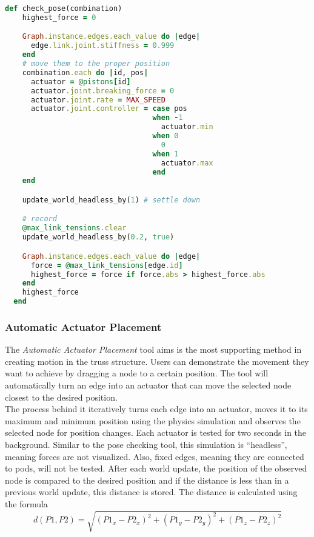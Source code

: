 \begin{lstlisting}[language=Ruby, label={lst:pose_check}, caption=excerpt from UI callbacks]
  def check_pose(combination)
    highest_force = 0

    Graph.instance.edges.each_value do |edge|
      edge.link.joint.stiffness = 0.999
    end
    # move them to the proper position
    combination.each do |id, pos|
      actuator = @pistons[id]
      actuator.joint.breaking_force = 0
      actuator.joint.rate = MAX_SPEED
      actuator.joint.controller = case pos
                                  when -1
                                    actuator.min
                                  when 0
                                    0
                                  when 1
                                    actuator.max
                                  end
    end

    update_world_headless_by(1) # settle down

    # record
    @max_link_tensions.clear
    update_world_headless_by(0.2, true)

    Graph.instance.edges.each_value do |edge|
      force = @max_link_tensions[edge.id]
      highest_force = force if force.abs > highest_force.abs
    end
    highest_force
  end
\end{lstlisting}

\subsubsection{Automatic Actuator Placement}
The \textit{Automatic Actuator Placement} tool aims is the most supporting method in creating motion in the truss structure. Users can demonstrate the movement they want to achieve by dragging a node to a certain position. The tool will automatically turn an edge into an actuator that can move the selected node closest to the desired position.\\
The process behind it iteratively turns each edge into an actuator, moves it to its maximum and minimum position using the physics simulation and observes the selected node for position changes. Each actuator is tested for two seconds in the background. Similar to the pose checking tool, this simulation is ``headless'', meaning forces are not visualized. Also, fixed edges, meaning they are connected to pods, will not be tested. After each world update, the position of the observed node is compared to the desired position and if the distance is less than in a previous world update, this distance is stored. The distance is calculated using the formula
\begin{equation}
  d(P1, P2) = \sqrt{(P1_x - P2_x)^2 + (P1_y - P2_y)^2 + (P1_z - P2_z)^2}
\end{equation}


